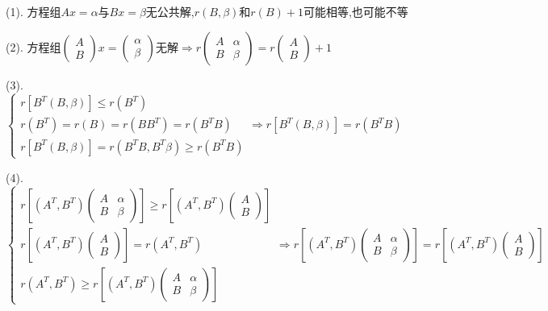 \begin{solution}

	(1). 方程组$Ax=\alpha$与$Bx=\beta$无公共解,$r(B,\beta)$和$r(B)+1$可能相等,也可能不等
	
	(2). 方程组$\left( \begin{matrix}
		A\\B
	\end{matrix}\right)x=\left( \begin{matrix}
		\alpha\\\beta
	\end{matrix}\right)$无解$\Rightarrow r\left(\begin{matrix}
	A&\alpha\\B&\beta
\end{matrix}\right)=r\left( \begin{matrix}
A\\B
\end{matrix}\right) +1$

	(3). $\left\lbrace
	\begin{array}{l}
		r\left[B^{T}(B,\beta)\right]\leq r(B^{T})\\
		r(B^{T})=r(B)=r(BB^{T})=r(B^{T}B)\\
		r\left[B^{T}(B,\beta)\right]=r(B^{T}B,B^{T}\beta)\geq r(B^{T}B)
	\end{array}
	\right. \Rightarrow r\left[B^{T}(B,\beta)\right]=r(B^{T}B)$
	
	(4). $$\left\lbrace
	\begin{array}{l}
		r\left[(A^T,B^T)\left(\begin{matrix}
			A&\alpha\\B&\beta
		\end{matrix} \right) \right]\geq r\left[ (A^T,B^T)\left( \begin{matrix}
		A\\B
	\end{matrix}\right) \right] \\
		r\left[ (A^T,B^T)\left( \begin{matrix}
			A\\B
		\end{matrix}\right) \right] =r(A^{T},B^{T})\\
	r(A^{T},B^{T})\geq r\left[(A^T,B^T)\left(\begin{matrix}
		A&\alpha\\B&\beta
	\end{matrix} \right) \right]
	\end{array}
	\right. \Rightarrow r\left[(A^T,B^T)\left(\begin{matrix}
		A&\alpha\\B&\beta
	\end{matrix} \right) \right] =r\left[ (A^T,B^T)\left( \begin{matrix}
		A\\B
	\end{matrix}\right) \right] $$
\end{solution}


